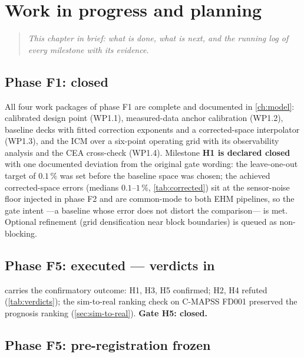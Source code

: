 \chapter{Work in progress and planning}
\label{ch:wip}

\begin{quote}\itshape
This chapter in brief: what is done, what is next, and the running log of every milestone with
its evidence.
\end{quote}

\section{Phase F1: closed}

All four work packages of phase F1 are complete and documented in \cref{ch:model}: calibrated
design point (WP1.1), measured-data anchor calibration (WP1.2), baseline decks with fitted
correction exponents and a corrected-space interpolator (WP1.3), and the ICM over a six-point
operating grid with its observability analysis and the CEA cross-check (WP1.4). Milestone
\textbf{H1 is declared closed} with one documented deviation from the original gate wording:
the leave-one-out target of $0.1\,\%$ was set before the baseline space was chosen; the
achieved corrected-space errors (medians $0.1$--$1\,\%$, \cref{tab:corrected}) sit at the
sensor-noise floor injected in phase F2 and are common-mode to both EHM pipelines, so the gate
intent ---a baseline whose error does not distort the comparison--- is met. Optional
refinement (grid densification near block boundaries) is queued as non-blocking.

\section{Phase F5: executed --- verdicts in}

 carries the confirmatory outcome: H1, H3, H5 confirmed; H2, H4 refuted
(\cref{tab:verdicts}); the sim-to-real ranking check on C-MAPSS FD001 preserved the
prognosis ranking (\cref{sec:sim-to-real}). \textbf{Gate H5: closed.}

\section{Phase F5: pre-registration frozen}

